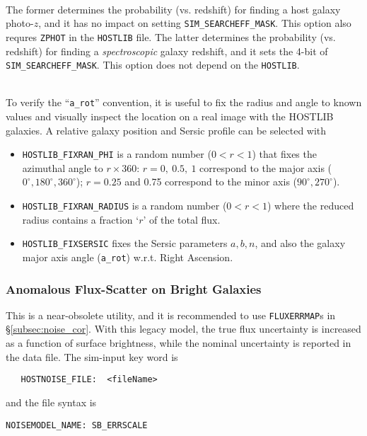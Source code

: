 \documentclass[12pt]{article}
\begin{document}
{\bigskip 
{}\\
The former determines the probability (vs. redshift) for finding
a host galaxy photo-$z$, and it has no impact on setting
{\tt SIM\_SEARCHEFF\_MASK}. This option also requres {\tt ZPHOT} 
in the {\tt HOSTLIB} file.
The latter determines the probability (vs. redshift) for finding
a {\it spectroscopic} galaxy redshift, and it sets the 4-bit of
{\tt SIM\_SEARCHEFF\_MASK}. This option does not depend on the
{\tt HOSTLIB}.



\bigskip
{} \\
To verify the ``{\tt a\_rot}'' convention, it is useful to fix the
radius and angle to known values and visually inspect the location
on a real image with the HOSTLIB galaxies. A relative
galaxy position and Sersic profile can be selected with
\begin{itemize}
  \item {\tt HOSTLIB\_FIXRAN\_PHI} is a random number ($0<r<1$) 
        that fixes the azimuthal angle to $r\times 360$:
        $r=0,~0.5,~1$ correspond to the major axis 
        ($0^{\circ},180^{\circ},360^{\circ}$); 
        $r=0.25$ and 0.75 correspond to the minor axis
        ($90^{\circ},270^{\circ}$).
  \item {\tt HOSTLIB\_FIXRAN\_RADIUS} is a random number ($0<r<1$)
         where the reduced radius contains a fraction  
         `$r$' of the total flux.
%
 \item {\tt HOSTLIB\_FIXSERSIC} fixes the Sersic parameters
       $a,b,n$, and also the galaxy major axis angle ({\tt a\_rot})
       w.r.t. Right Ascension.
\end{itemize}


\clearpage
\subsubsection{Anomalous Flux-Scatter on Bright Galaxies}

This is a near-obsolete utility, and it is recommended to use
{\tt FLUXERRMAP}s in \S\ref{subsec:noise_cor}.
With this legacy model, the true flux uncertainty is increased as a 
function of surface brightness, while the nominal uncertainty is 
reported in the data file.
The sim-input key word is
%
\begin{verbatim}
   HOSTNOISE_FILE:  <fileName>
\end{verbatim}
%
and the file syntax is
%
\begin{Verbatim}[frame=single]
NOISEMODEL_NAME: SB_ERRSCALE 


\end{Verbatim}}
\end{document}
